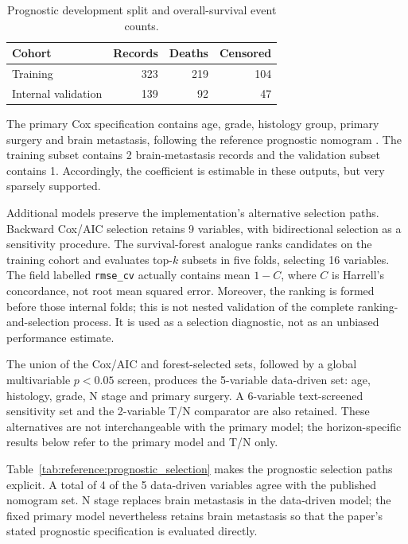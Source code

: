 \begin{table}[htbp]
\centering\small
\caption{Prognostic development split and overall-survival event counts.}
\label{tab:reference:prognostic_split}
\begin{tabular}{@{}lrrr@{}}
\toprule
Cohort & Records & Deaths & Censored \\
\midrule
Training & 323 & 219 & 104 \\
Internal validation & 139 & 92 & 47 \\
\bottomrule
\end{tabular}
\end{table}

The primary Cox specification contains age, grade, histology group, primary
surgery and brain metastasis, following the reference prognostic nomogram
\citep{Li2023}. The training subset contains 2 brain-metastasis records and the
validation subset contains 1. Accordingly, the coefficient is estimable in these
outputs, but very sparsely supported.

Additional models preserve the implementation's alternative selection paths.
Backward Cox/AIC selection retains 9 variables, with bidirectional selection
as a sensitivity procedure. The survival-forest analogue ranks candidates on the
training cohort and evaluates top-$k$ subsets in five folds, selecting 16 variables.
The field labelled \texttt{rmse\_cv} actually contains mean $1-C$, where $C$ is
Harrell's concordance, not root mean squared error. Moreover, the ranking is formed
before those internal folds; this is not nested validation of the complete
ranking-and-selection process. It is used as a selection diagnostic, not as an
unbiased performance estimate.

The union of the Cox/AIC and forest-selected sets, followed by a global
multivariable $p<0.05$ screen, produces the 5-variable data-driven set: age,
histology, grade, N stage and primary surgery. A 6-variable text-screened sensitivity
set and the 2-variable T/N comparator are also retained. These alternatives are
not interchangeable with the primary model; the horizon-specific results below
refer to the primary model and T/N only.

Table~\ref{tab:reference:prognostic_selection} makes the prognostic selection paths
explicit. A total of 4 of the 5 data-driven variables agree with the published nomogram
set. N stage replaces brain metastasis in the data-driven model; the fixed primary
model nevertheless retains brain metastasis so that the paper's stated prognostic
specification is evaluated directly.

